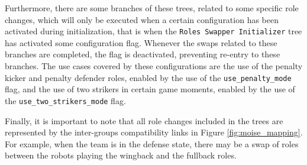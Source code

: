 Furthermore, there are some branches of these trees, related to some specific role changes, which will only be executed when a certain configuration has been activated during initialization, that is when the \texttt{Roles Swapper Initializer} tree has activated some configuration flag. Whenever the swaps related to these branches are completed, the flag is deactivated, preventing re-entry to these branches. The use cases covered by these configurations are the use of the penalty kicker and penalty defender roles, enabled by the use of the \texttt{use\_penalty\_mode} flag, and the use of two strikers in certain game moments, enabled by the use of the \texttt{use\_two\_strikers\_mode} flag.

Finally, it is important to note that all role changes included in the trees are represented by the inter-groups compatibility links in Figure \ref{fig:moise_mapping}. For example, when the team is in the defense state, there may be a swap of roles between the robots playing the wingback and the fullback roles.
